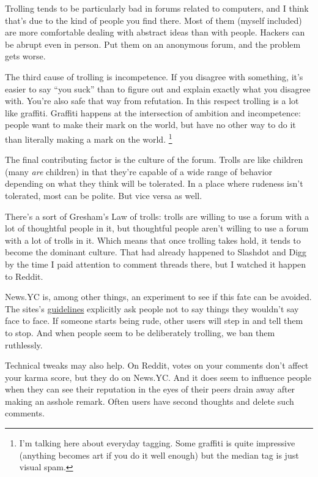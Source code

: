 \documentclass[12pt]{book}
\begin{document}
Trolling tends to be particularly bad in forums related to computers,
and I think that's due to the kind of people you find there. Most of
them (myself included) are more comfortable dealing with abstract ideas
than with people. Hackers can be abrupt even in person. Put them on an
anonymous forum, and the problem gets worse.

The third cause of trolling is incompetence. If you disagree with
something, it's easier to say ``you suck'' than to figure out and
explain exactly what you disagree with. You're also safe that way from
refutation. In this respect trolling is a lot like graffiti. Graffiti
happens at the intersection of ambition and incompetence: people want to
make their mark on the world, but have no other way to do it than
literally making a mark on the world. \footnote{I'm talking here about everyday tagging. Some graffiti is quite
impressive (anything becomes art if you do it well enough) but the
median tag is just visual spam.}

The final contributing factor is the culture of the forum. Trolls are
like children (many \emph{are} children) in that they're capable of a
wide range of behavior depending on what they think will be tolerated.
In a place where rudeness isn't tolerated, most can be polite. But vice
versa as well.

There's a sort of Gresham's Law of trolls: trolls are willing to use a
forum with a lot of thoughtful people in it, but thoughtful people
aren't willing to use a forum with a lot of trolls in it. Which means
that once trolling takes hold, it tends to become the dominant culture.
That had already happened to Slashdot and Digg by the time I paid
attention to comment threads there, but I watched it happen to Reddit.

News.YC is, among other things, an experiment to see if this fate can be
avoided. The sites's
\href{http://ycombinator.com/newsguidelines.html}{guidelines} explicitly
ask people not to say things they wouldn't say face to face. If someone
starts being rude, other users will step in and tell them to stop. And
when people seem to be deliberately trolling, we ban them ruthlessly.

Technical tweaks may also help. On Reddit, votes on your comments don't
affect your karma score, but they do on News.YC. And it does seem to
influence people when they can see their reputation in the eyes of their
peers drain away after making an asshole remark. Often users have second
thoughts and delete such comments.
\end{document}
